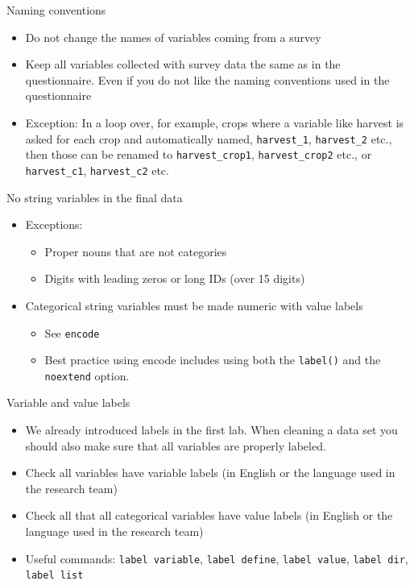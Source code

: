 \documentclass[aspectratio=169]{beamer}
\begin{document}
\begin{frame}{Naming conventions}
	\begin{itemize}
		\item Do not change the names of variables coming from a survey
		\item Keep all variables collected with survey data the same as in the questionnaire. Even if you do not like the naming conventions used in the questionnaire
		\item Exception: In a loop over, for example, crops where a variable like harvest is asked for each crop and automatically named, \texttt{harvest\_1}, \texttt{harvest\_2} etc., then those can be renamed to \texttt{harvest\_crop1}, \texttt{harvest\_crop2} etc., or \texttt{harvest\_c1}, \texttt{harvest\_c2} etc.
	\end{itemize}
\end{frame}

\begin{frame}{No string variables in the final data }
	\begin{itemize}
		\item Exceptions:
		\begin{itemize}
			\item Proper nouns that are not categories
			\item Digits with leading zeros or long IDs (over 15 digits)
		\end{itemize}
		\item Categorical string variables must be made numeric with value labels
		\begin{itemize}
			\item See \texttt{encode}
			\item Best practice using encode includes using both the \texttt{label()} and the \texttt{noextend} option.
		\end{itemize}
	\end{itemize}
\end{frame}

\begin{frame}{Variable and value labels }
	\begin{itemize}
		\item We already introduced labels in the first lab. When cleaning a data set you should also make sure that all variables are properly labeled.
		\item Check all variables have variable labels (in English or the language used in the research team)
		\item Check all that all categorical variables have value labels (in English or the language used in the research team)
		\item Useful commands: \texttt{label variable}, \texttt{label define}, \texttt{label value}, \texttt{label dir}, \texttt{label list}
	\end{itemize}
\end{frame}
\end{document}
